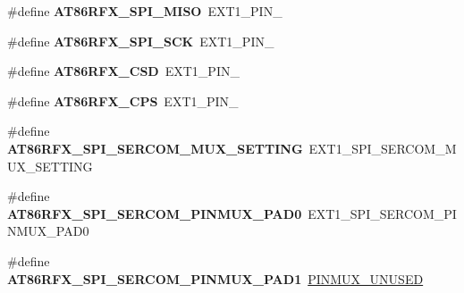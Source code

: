 \begin{DoxyCompactItemize}
\item 
\hypertarget{group__saml21__xplained__pro__features__group_gae94f4ee76dbc7c98914924139a00ce7c}{}\#define {\bfseries A\+T86\+R\+F\+X\+\_\+\+S\+P\+I\+\_\+\+M\+I\+S\+O}~E\+X\+T1\+\_\+\+P\+I\+N\+\_\label{group__saml21__xplained__pro__features__group_gae94f4ee76dbc7c98914924139a00ce7c}

\item 
\hypertarget{group__saml21__xplained__pro__features__group_ga41fdd48f6f888b5ca6a7feb2f05d3854}{}\#define {\bfseries A\+T86\+R\+F\+X\+\_\+\+S\+P\+I\+\_\+\+S\+C\+K}~E\+X\+T1\+\_\+\+P\+I\+N\+\_\label{group__saml21__xplained__pro__features__group_ga41fdd48f6f888b5ca6a7feb2f05d3854}

\item 
\hypertarget{group__saml21__xplained__pro__features__group_ga430273647e1d67daca425814199d8263}{}\#define {\bfseries A\+T86\+R\+F\+X\+\_\+\+C\+S\+D}~E\+X\+T1\+\_\+\+P\+I\+N\+\_\label{group__saml21__xplained__pro__features__group_ga430273647e1d67daca425814199d8263}

\item 
\hypertarget{group__saml21__xplained__pro__features__group_gaba085369f8aff843cee2f8057b1c58f4}{}\#define {\bfseries A\+T86\+R\+F\+X\+\_\+\+C\+P\+S}~E\+X\+T1\+\_\+\+P\+I\+N\+\_\label{group__saml21__xplained__pro__features__group_gaba085369f8aff843cee2f8057b1c58f4}

\item 
\hypertarget{group__saml21__xplained__pro__features__group_ga4663eb0da79c88b144a813e9761de3c4}{}\#define {\bfseries A\+T86\+R\+F\+X\+\_\+\+S\+P\+I\+\_\+\+S\+E\+R\+C\+O\+M\+\_\+\+M\+U\+X\+\_\+\+S\+E\+T\+T\+I\+N\+G}~E\+X\+T1\+\_\+\+S\+P\+I\+\_\+\+S\+E\+R\+C\+O\+M\+\_\+\+M\+U\+X\+\_\+\+S\+E\+T\+T\+I\+N\+G\label{group__saml21__xplained__pro__features__group_ga4663eb0da79c88b144a813e9761de3c4}

\item 
\hypertarget{group__saml21__xplained__pro__features__group_gab6e5a51ab581ce47972810f020c0cc04}{}\#define {\bfseries A\+T86\+R\+F\+X\+\_\+\+S\+P\+I\+\_\+\+S\+E\+R\+C\+O\+M\+\_\+\+P\+I\+N\+M\+U\+X\+\_\+\+P\+A\+D0}~E\+X\+T1\+\_\+\+S\+P\+I\+\_\+\+S\+E\+R\+C\+O\+M\+\_\+\+P\+I\+N\+M\+U\+X\+\_\+\+P\+A\+D0\label{group__saml21__xplained__pro__features__group_gab6e5a51ab581ce47972810f020c0cc04}

\item 
\hypertarget{group__saml21__xplained__pro__features__group_gae42390243121076aed22eb5510cc56cc}{}\#define {\bfseries A\+T86\+R\+F\+X\+\_\+\+S\+P\+I\+\_\+\+S\+E\+R\+C\+O\+M\+\_\+\+P\+I\+N\+M\+U\+X\+\_\+\+P\+A\+D1}~\hyperlink{group__asfdoc__sam0__sercom__usart__group_gaffde9ff712058ef836127e1f3368889e}{P\+I\+N\+M\+U\+X\+\_\+\+U\+N\+U\+S\+E\+D}\label{group__saml21__xplained__pro__features__group_gae42390243121076aed22eb5510cc56cc}


\end{DoxyCompactItemize}
